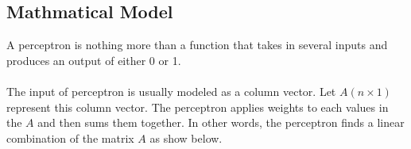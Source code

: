 \subsection{Mathmatical Model}	
		
		A perceptron is nothing more than a function that takes in several inputs and produces an output of either 0 or 1. \\ \\
		The input of perceptron is usually modeled as a column vector. Let $A(n\times1)$ represent this column vector. The perceptron applies weights to each values in the $A$ and then sums them together. In other words, the perceptron finds a linear combination of the matrix $A$ as show below.
		
$$
		